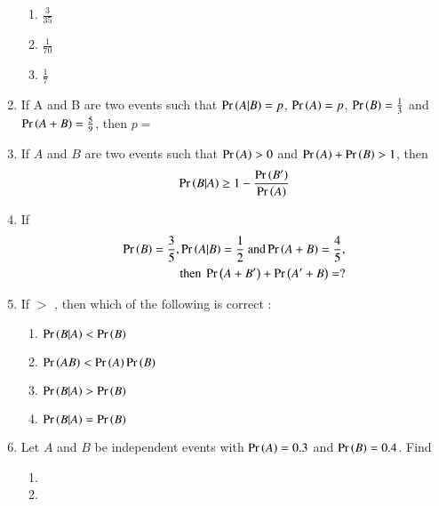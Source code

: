 \begin{enumerate}[label=\thesubsection.\arabic*,ref=\thesubsection.\theenumi]
\begin{enumerate}
    \item $\frac{3}{35}$
    \item $\frac{1}{70}$
    \item $\frac{1}{7}$
\end{enumerate}
\solution

\item If A and B are two events such that $\Pr\left(A|B\right)=p$, $\Pr\left(A\right)=p$, $\Pr\left(B\right)=\frac{1}{3}$ and $\Pr\left(A+B\right)=\frac{5}{9}$, then $p=$\\
\solution

\item If $A$ and $B$ are two events such that $\Pr\left(A\right) > 0$ and $\Pr\left(A\right) + \Pr\left(B\right) > 1$, then 
\begin{align}
    \pr{B | A} \geq 1 - \frac{\pr{B^\prime}}{\pr{A}}
	\label{eq:12/13/3/102/final}
\end{align}
\solution

\item If 
\begin{align}
\Pr\left(B\right) = \frac{3}{5},
\Pr\left(A|B\right) = \frac{1}{2} \text{ and}
\Pr\left(A + B\right) = \frac{4}{5}, 
\\
\text{then }
\Pr\left(A + B^{\prime}\right) + \Pr\left(A^{\prime} + B\right) =?
\end{align}
\solution

\item
 If  $>$ , then which of the following is correct :
\begin{enumerate}
 \item  
 \label{12.13.6.18.A}
$ \Pr\left(B|A\right) < \Pr\left(B\right)$\\
 \item 
  \label{12.13.6.18.B}
 $\Pr\left(AB\right)< \Pr\left(A\right)\Pr\left(B\right)$\\
 \item 
 \label{12.13.6.18.C}
 $\Pr\left(B|A\right) > \Pr\left(B\right)$\\
 \item 
  \label{12.13.6.18.D}
 $\Pr\left(B|A\right) = \Pr\left(B\right)$\\
 \end{enumerate}
\solution 

\item Let  $A$ and $B$ be independent events with $\Pr\left(A\right) = 0.3$ and $\Pr\left(B\right) = 0.4$. Find 
\begin{enumerate}
\item {} \item {}


\end{enumerate}
\end{enumerate}
